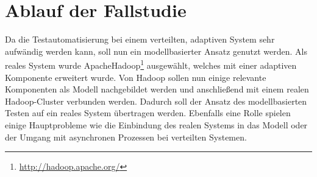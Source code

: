 \chapter{Ablauf der Fallstudie}\label{sec:fallstudie}

Da die Testautomatisierung bei einem verteilten, adaptiven System sehr aufwändig werden kann, soll nun ein modellbasierter Ansatz genutzt werden. Als reales System wurde Apache\texttrademark Hadoop\textregistered\footnote{\url{http://hadoop.apache.org/}} ausgewählt, welches mit einer adaptiven Komponente erweitert wurde. Von Hadoop sollen nun einige relevante Komponenten als Modell nachgebildet werden und anschließend mit einem realen Hadoop-Cluster verbunden werden. Dadurch soll der Ansatz des modellbasierten Testen auf ein reales System übertragen werden. Ebenfalls eine Rolle spielen einige Hauptprobleme wie \zB die Einbindung des realen Systems in das Modell oder der Umgang mit asynchronen Prozessen bei verteilten Systemen.







